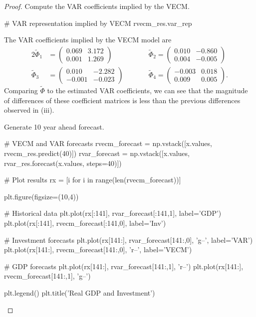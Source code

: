 \documentclass[oneside,reqno]{amsart}
\theoremstyle{definition}
\begin{document}
\begin{enumerate}[label=(\roman*)]
\begin{proof}
Compute the VAR coefficients implied by the VECM.
\begin{python3code}
# VAR representation implied by VECM
rvecm_res.var_rep
\end{python3code}

The VAR coefficients implied by the VECM model are 
\begin{alignat*}{2}
	\widetilde \Phi_1 &= \begin{pmatrix}
		 0.069 &  3.172 \\
		0.001 &  1.269
	\end{pmatrix} \qquad &&
	\widetilde \Phi_2= \begin{pmatrix}
		0.010 & -0.860 \\ 
		0.004 & -0.005
	\end{pmatrix} \\
	\widetilde \Phi_3 &= \begin{pmatrix}
		 0.010 & -2.282 \\ 
		-0.001 & -0.023
	\end{pmatrix} \qquad&&
	\widetilde \Phi_4  = \begin{pmatrix}
		-0.003 & 0.018 \\
        		0.009 &  0.005
	\end{pmatrix}.
\end{alignat*}
Comparing $\widetilde \Phi$ to the estimated VAR coefficients, we can see that the magnitude of differences of these coefficient matrices is less than the previous differences observed in (iii).
\par
Generate 10 year ahead forecast. 
\begin{python3code}
# VECM and VAR forecasts
rvecm_forecast = np.vstack([x.values, rvecm_res.predict(40)])
rvar_forecast = np.vstack([x.values, rvar_res.forecast(x.values, steps=40)])

# Plot results
rx = [i for i in range(len(rvecm_forecast))]

plt.figure(figsize=(10,4))

# Historical data
plt.plot(rx[:141], rvar_forecast[:141,1],  label='GDP')
plt.plot(rx[:141], rvecm_forecast[:141,0], label='Inv')

# Investment forecasts
plt.plot(rx[141:], rvar_forecast[141:,0], 'g--', label='VAR')
plt.plot(rx[141:], rvecm_forecast[141:,0], 'r--', label='VECM')

# GDP forecasts
plt.plot(rx[141:], rvar_forecast[141:,1], 'r--')
plt.plot(rx[141:], rvecm_forecast[141:,1], 'g--')

plt.legend()
plt.title('Real GDP and Investment')


\end{python3code}
\end{proof}
\end{enumerate}
\end{document}
